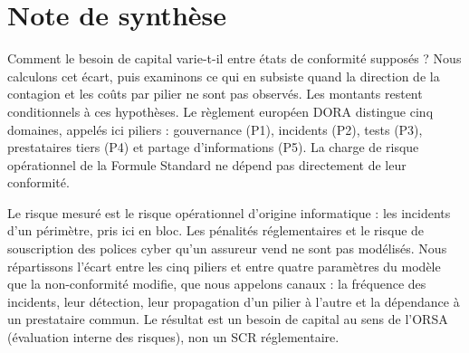 ﻿%
%

\providecommand*{\notesec}[1]{\par\smallskip\noindent{\bfseries #1}\par}

\chapter*{Note de synthèse}


\notesec{Contexte et objectif}
Comment le besoin de capital varie-t-il entre états de conformité supposés ? Nous calculons
cet écart, puis examinons ce qui en subsiste quand la direction de la contagion et les coûts par
pilier ne sont pas observés. Les montants restent conditionnels à ces hypothèses.
Le règlement européen DORA distingue cinq domaines, appelés ici piliers : gouvernance (P1),
incidents (P2), tests (P3), prestataires tiers (P4) et partage d'informations (P5). La charge de
risque opérationnel de la Formule Standard ne dépend pas directement de leur conformité.

Le risque mesuré est le risque opérationnel d'origine informatique : les incidents d'un périmètre, pris ici en bloc. Les pénalités réglementaires et le risque de souscription des polices cyber
qu'un assureur vend ne sont pas modélisés. Nous répartissons l'écart entre les cinq piliers et entre
quatre paramètres du modèle que la non-conformité modifie, que nous appelons canaux : la fréquence
des incidents, leur détection, leur propagation d'un pilier à l'autre et la dépendance à un
prestataire commun. Le résultat est un besoin de capital au sens de l'ORSA (évaluation interne des risques), non un SCR réglementaire.

